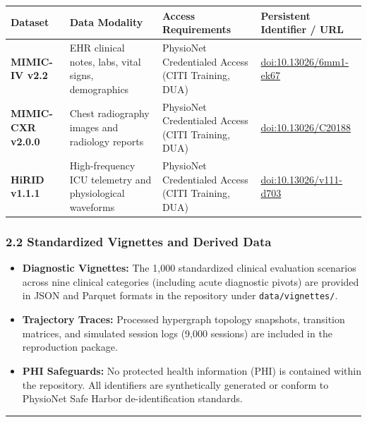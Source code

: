 \documentclass[10pt, letterpaper]{article}
\begin{document}
\begin{table}[h!]
\centering
\small
\begin{tabularx}{\textwidth}{@{}l p{5.0cm} p{3.4cm} X@{}}
\toprule
\textbf{Dataset} & \textbf{Data Modality} & \textbf{Access Requirements} & \textbf{Persistent Identifier / URL} \\
\midrule
\textbf{MIMIC-IV v2.2} & EHR clinical notes, labs, vital signs, demographics & PhysioNet Credentialed Access (CITI Training, DUA) & \href{https://doi.org/10.13026/6mm1-ek67}{doi:10.13026/6mm1-ek67} \\
\addlinespace[2pt]
\textbf{MIMIC-CXR v2.0.0} & Chest radiography images and radiology reports & PhysioNet Credentialed Access (CITI Training, DUA) & \href{https://doi.org/10.13026/C20188}{doi:10.13026/C20188} \\
\addlinespace[2pt]
\textbf{HiRID v1.1.1} & High-frequency ICU telemetry and physiological waveforms & PhysioNet Credentialed Access (CITI Training, DUA) & \href{https://doi.org/10.13026/v111-d703}{doi:10.13026/v111-d703} \\
\bottomrule
\end{tabularx}
\end{table}

\vspace{-6pt}
\subsubsection*{2.2 Standardized Vignettes and Derived Data}
\begin{itemize}\setlength{\itemsep}{0.5pt}\setlength{\parskip}{0pt}
    \item \textbf{Diagnostic Vignettes:} The 1{,}000 standardized clinical evaluation scenarios across nine clinical categories (including acute diagnostic pivots) are provided in JSON and Parquet formats in the repository under \texttt{data/vignettes/}.
    \item \textbf{Trajectory Traces:} Processed hypergraph topology snapshots, transition matrices, and simulated session logs (9{,}000 sessions) are included in the reproduction package.
    \item \textbf{PHI Safeguards:} No protected health information (PHI) is contained within the repository. All identifiers are synthetically generated or conform to PhysioNet Safe Harbor de-identification standards.
\end{itemize}

\vspace{3pt}
\hrule
\vspace{3pt}
\end{document}
